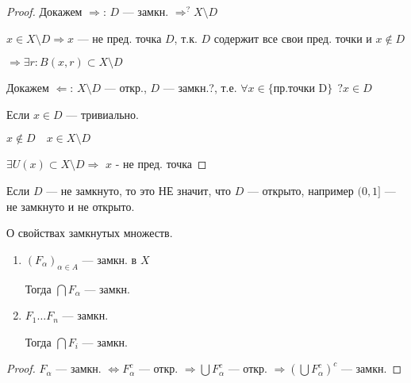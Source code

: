 \begin{proof}
    Докажем $\Rightarrow$: $D$ --- замкн. $\Rightarrow^? X\setminus D$

    $x\in X\setminus D \Rightarrow x$ --- не пред. точка $D$, т.к. $D$ содержит все свои пред. точки и $x\not\in D$ 
    
    $\Rightarrow\exists r : B(x,r)\subset X\setminus D$

    Докажем $\Leftarrow$: $X\setminus D$ --- откр., $D$ --- замкн.?, т.е. $\forall x\in\{\text{пр.точки D}\} \ \ ?x\in D$

    Если $x\in D$ --- тривиально.

    $x\not\in D\quad x\in X\setminus D$

    $\exists U(x)\subset X\setminus D \Rightarrow$ $x$ - не пред. точка
\end{proof}

\begin{remark}
    Если $D$ --- не замкнуто, то это НЕ значит, что $D$ --- открыто, например $(0,1]$ --- не замкнуто и не открыто.
\end{remark}

\begin{theorem}
    О свойствах замкнутых множеств.

    \begin{enumerate}
        \item $(F_\alpha)_{\alpha\in A}$ --- замкн. в $X$
        
        Тогда $\bigcap F_\alpha$ --- замкн.

        \item $F_1\ldots F_n$ --- замкн.
        
        Тогда $\bigcap F_i$ --- замкн.
    \end{enumerate}
\end{theorem}

\begin{proof}
    $F_\alpha$ --- замкн. $\Leftrightarrow F_\alpha^c$ --- откр. $\Rightarrow \bigcup F_\alpha^c$ --- откр. $\Rightarrow (\bigcup F_\alpha^c)^c$ --- замкн.
\end{proof}

